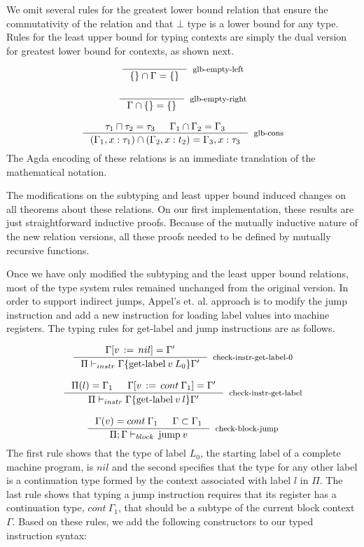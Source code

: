\documentclass[review]{elsarticle}
\theoremstyle{definition}
\begin{document}
We omit several rules for the greatest lower bound relation that ensure the commutativity of the
relation and that $\bot$ type is a lower bound for any type. Rules for the least upper bound for
typing contexts are simply the dual version for greatest lower bound for contexts, as shown next.
\[
  \begin{array}{c}
    \inference{}{\{\} \cap \Gamma = \{\}}[glb-empty-left] \\ \\
    \inference{}{\Gamma \cap \{\} = \{\}}[glb-empty-right] \\ \\
    \inference{\tau_1 \sqcap \tau_2 = \tau_3 & \Gamma_1 \cap \Gamma_2 = \Gamma_3}
              {(\Gamma_1 , x : \tau_1) \cap (\Gamma_2 , x : t_2) = \Gamma_3, x : \tau_3}
              [glb-cons]
  \end{array}
\]
The Agda encoding of these relations is an immediate translation of the mathematical notation.

The modifications on the subtyping and least upper bound induced changes on all theorems
about these relations. On our first implementation, these results are just straightforward
inductive proofs. Because of the mutually inductive nature of the new relation versions, all
these proofs needed to be defined by mutually recursive functions.

Once we have only modified the subtyping and the least upper bound relations, most of the type system
rules remained unchanged from the original version. In order to support indirect jumps, Appel's et. al.
approach is to modify the jump instruction and add a new instruction for loading label values into
machine registers. The typing rules for get-label and jump instructions are as follows.

\[
\begin{array}{c}
  \inference{\Gamma[v\,:=\,nil] = \Gamma'}
            {\Pi\vdash_{instr} \Gamma \{\textrm{get-label}\:v\:L_0\}\Gamma'}
            [check-instr-get-label-0] \\ \\
  \inference{\Pi(l) = \Gamma_1 & \Gamma[v\,:=\,cont\:\Gamma_1] = \Gamma'}
            {\Pi\vdash_{instr} \Gamma \{\textrm{get-label}\:v\:l\}\Gamma'}
            [check-instr-get-label]\\ \\
  \inference{\Gamma(v) = cont\:\Gamma_1 & \Gamma \subset \Gamma_1}
            {\Pi;\Gamma\vdash_{block}\,\textrm{jump}\:v}
            [check-block-jump]
\end{array}
\]
The first rule shows that the type of label $L_0$, the starting label of a complete machine program,
is $nil$ and the second specifies that the type for any other label is a continuation type formed by
the context associated with label $l$ in $\Pi$. The last rule shows that typing a jump instruction
requires that its register has a continuation type, $cont\:\Gamma_1$, that should be a subtype of
the current block context $\Gamma$. Based on these rules, we add the following constructors to our
typed instruction syntax:
\end{document}
